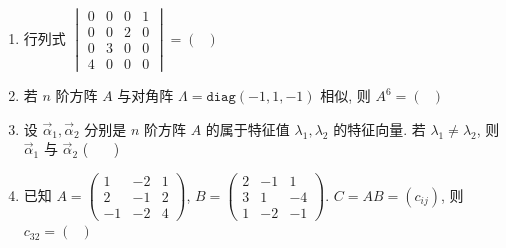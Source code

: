 \begin{enumerate}
	\item 行列式 $\begin{vmatrix} 0 & 0 & 0 & 1 \\ 0 & 0 & 2 & 0 \\ 0 & 3 & 0 & 0 \\ 4 & 0 & 0 & 0 \end{vmatrix} = ( \ \ \ )$
	\vspace{0.5em}
	
	\item 若 $n$ 阶方阵 $A$ 与对角阵 $\Lambda = \texttt{diag}(-1, 1, -1)$ 相似, 则 $A^6 = ( \ \ \ )$
	\vspace{0.5em}
	
	
	\item 设 $\vec{\alpha}_1, \vec{\alpha}_2$ 分别是 $n$ 阶方阵 $A$ 的属于特征值 $\lambda_1, \lambda_2$ 的特征向量. 若 $\lambda_1 \neq \lambda_2$, 则 $\vec{\alpha}_1$ 与 $\vec{\alpha}_2$ ( \ \ \ )
	\vspace{0.5em}
	
	
	\item 已知 $A = \begin{pmatrix} 1 & -2 & 1 \\ 2 & -1 & 2 \\ -1 & -2 & 4 \end{pmatrix}$, $B = \begin{pmatrix} 2 & -1 & 1 \\ 3 & 1 & -4 \\ 1 & -2 & -1 \end{pmatrix}$. $C = AB = (c_{ij})$, 则 $c_{32} = ( \ \ \ )$
	\vspace{0.5em}
	

\end{enumerate}
